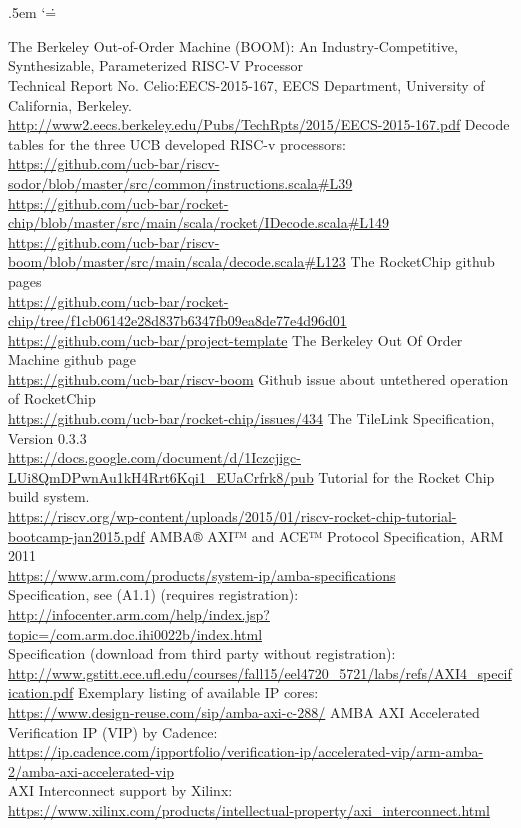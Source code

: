 \documentclass[journal,a4paper]{IEEEtran}
\makeatletter
\renewenvironment{thebibliography}[1]{%
	\section*{\textsc{\refname}}%
	\normalfont\footnotesize\labelsep .5em\relax
	\renewcommand\theenumiv{\arabic{enumiv}}\let\p@enumiv\@empty
	\list{\@biblabel{\theenumiv}}{\@bibNote\settowidth\labelwidth{\@biblabel{#1}}%
	\leftmargin\labelwidth \advance\leftmargin\labelsep
	\usecounter{enumiv}}%
	\sloppy \clubpenalty\@M \widowpenalty\clubpenalty
	\sfcode`\.=\@m
}{%
	\def\@noitemerr{\@latex@warning{Empty `thebibliography' environment}}%
	\endlist
}
\makeatother
\begin{document}
\begin{thebibliography}{1}
		The Berkeley Out-of-Order Machine (BOOM): An Industry-Competitive, Synthesizable, Parameterized RISC-V Processor\\
		Technical Report No. Celio:EECS-2015-167, EECS Department, University of California, Berkeley.\\
		\url{http://www2.eecs.berkeley.edu/Pubs/TechRpts/2015/EECS-2015-167.pdf}
		Decode tables for the three UCB developed RISC-v processors:\\
		\url{https://github.com/ucb-bar/riscv-sodor/blob/master/src/common/instructions.scala#L39}\\
		\url{https://github.com/ucb-bar/rocket-chip/blob/master/src/main/scala/rocket/IDecode.scala#L149}\\
		\url{https://github.com/ucb-bar/riscv-boom/blob/master/src/main/scala/decode.scala#L123}
		The RocketChip github pages\\
		\url{https://github.com/ucb-bar/rocket-chip/tree/f1cb06142e28d837b6347fb09ea8de77e4d96d01}\\
		\url{https://github.com/ucb-bar/project-template}
		The Berkeley Out Of Order Machine github page\\
		\url{https://github.com/ucb-bar/riscv-boom}
		Github issue about untethered operation of RocketChip\\
		\url{https://github.com/ucb-bar/rocket-chip/issues/434}
		The TileLink Specification, Version 0.3.3\\
		\url{https://docs.google.com/document/d/1Iczcjigc-LUi8QmDPwnAu1kH4Rrt6Kqi1_EUaCrfrk8/pub}
		Tutorial for the  Rocket Chip build system.\\
		\url{https://riscv.org/wp-content/uploads/2015/01/riscv-rocket-chip-tutorial-bootcamp-jan2015.pdf}
		AMBA® AXI™ and ACE™ Protocol Specification, ARM 2011\\
		\url{https://www.arm.com/products/system-ip/amba-specifications}\\
		Specification, see (A1.1) (requires registration):\\
		\url{http://infocenter.arm.com/help/index.jsp?topic=/com.arm.doc.ihi0022b/index.html}\\
		Specification (download from third party without registration):\\
		\url{http://www.gstitt.ece.ufl.edu/courses/fall15/eel4720_5721/labs/refs/AXI4_specification.pdf}
		Exemplary listing of available IP cores:\\
		\url{https://www.design-reuse.com/sip/amba-axi-c-288/}
		AMBA AXI Accelerated Verification IP (VIP) by Cadence:\\
		\url{https://ip.cadence.com/ipportfolio/verification-ip/accelerated-vip/arm-amba-2/amba-axi-accelerated-vip}\\
		AXI Interconnect support by Xilinx:\\
		\url{https://www.xilinx.com/products/intellectual-property/axi_interconnect.html}\\
\end{thebibliography}
\end{document}
